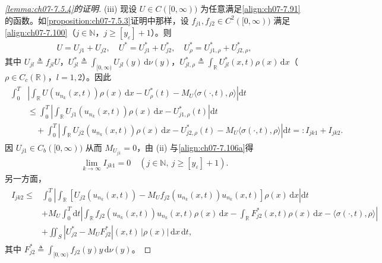 \documentclass[../../main.tex]{subfiles}%
\begin{document}
\begin{proof}[\cref{lemma:ch07-7.5.4}的证明]
(iii) 现设 $U\in C([0,\infty))$ 为任意满足\eqref{align:ch07-7.91}的函数。如\cref{proposition:ch07-7.5.3}证明中那样，设 $f_{j1},f_{j2}\in C^2([0,\infty))$ 满足\eqref{align:ch07-7.100}（$j\in\mathbb{N}$，$j\geqslant[y_\varepsilon]+1$）。则
\begin{align}
U=U_{j1}+U_{j2},\quad U^*=U_{j1}^*+U_{j2}^*,\quad U_\rho^*=U_{j1,\rho}^*+U_{j2,\rho}^*, \label{align:ch07-7.150}
\end{align}
其中 $U_{jl}\triangleq f_{jl}U$，$U_{jl}^*\triangleq \int_{[0,\infty)}U_{jl}(y)\,\mathrm{d}\nu(y)$，$U_{jl,\rho}^*\triangleq \int_{\mathbb{R}}U_{jl}^*(x,t)\rho(x)\,\mathrm{d}x$（$\rho\in C_c(\mathbb{R})$，$l=1,2$）。因此
\begin{align}
\begin{aligned}
\int_0^T&\left|\int_{\mathbb{R}}U(u_{n_k}(x,t))\rho(x)\,\mathrm{d}x-U_\rho^*(t)-M_U\langle\sigma(\cdot,t),\rho\rangle\right|\mathrm{d}t\\
&\leqslant\int_0^T\left|\int_{\mathbb{R}}U_{j1}(u_{n_k}(x,t))\rho(x)\,\mathrm{d}x-U_{j1,\rho}^*(t)\right|\mathrm{d}t\\
&\quad+\int_0^T\left|\int_{\mathbb{R}}U_{j2}(u_{n_k}(x,t))\rho(x)\,\mathrm{d}x-U_{j2,\rho}^*(t)-M_U\langle\sigma(\cdot,t),\rho\rangle\right|\mathrm{d}t=:I_{jk1}+I_{jk2}.
\end{aligned} 
\label{align:ch07-7.151}
\end{align}
因 $U_{j1}\in C_b([0,\infty))$ 从而 $M_{U_{j1}}=0$，由 (ii) 与\eqref{align:ch07-7.106a}得
\begin{align}
\lim_{k\to\infty}I_{jk1}=0\quad(j\in\mathbb{N},\ j\geqslant[y_\varepsilon]+1). \label{align:ch07-7.152}
\end{align}
另一方面，
\begin{align}
\begin{aligned}
I_{jk2}\leqslant{}&\int_0^T\left|\int_{\mathbb{R}}[U_{j2}(u_{n_k}(x,t))-M_U f_{j2}(u_{n_k}(x,t))u_{n_k}(x,t)]\rho(x)\,\mathrm{d}x\right|\mathrm{d}t\\
&+M_U\int_0^T\mathrm{d}t\left|\int_{\mathbb{R}}f_{j2}(u_{n_k}(x,t))u_{n_k}(x,t)\rho(x)\,\mathrm{d}x-\int_{\mathbb{R}}F_{j2}^*(x,t)\rho(x)\,\mathrm{d}x-\langle\sigma(\cdot,t),\rho\rangle\right|\\
&+\iint_S|U_{j2}^*-M_U F_{j2}^*|(x,t)\,|\rho(x)|\,\mathrm{d}x\,\mathrm{d}t,
\end{aligned} 
\label{align:ch07-7.153}
\end{align}
其中 $F_{j2}^*\triangleq \int_{[0,\infty)}f_{j2}(y)y\,\mathrm{d}\nu(y)$。


\end{proof}
\end{document}
